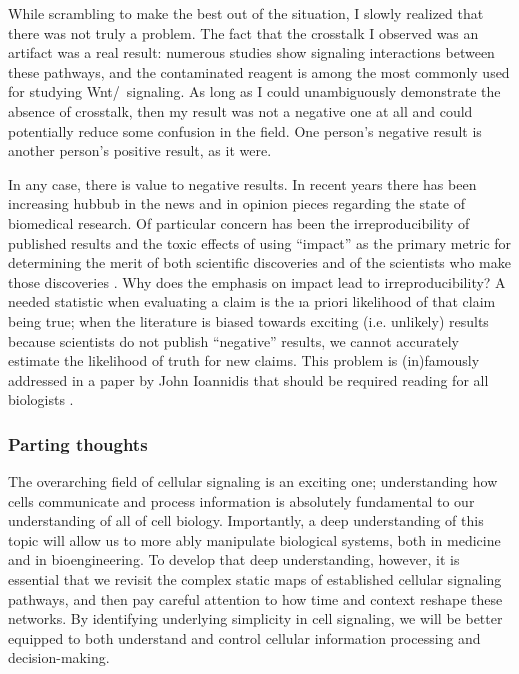 While scrambling to make the best out of the situation, I slowly
realized that there was not truly a problem. The fact that the crosstalk
I observed was an artifact was a real result: numerous studies
show signaling interactions between these pathways, and the contaminated
reagent is among the most commonly used for studying Wnt/\bcat\
signaling. As long as I
could unambiguously demonstrate the absence of crosstalk, then my result
was not a negative one at all and could potentially reduce some confusion
in the field. One person's negative result is another person's positive
result, as it were.


In any case, there is value to negative results. In recent years there
has been increasing hubbub in the news and in opinion pieces regarding
the state of biomedical research. Of particular concern has been the
irreproducibility of published results and the toxic effects of
using ``impact'' as the primary metric for determining the merit
of both scientific discoveries and of the scientists who make those discoveries
\cite{Schatz2014,Alberts2014}. Why does the emphasis on impact lead to
irreproducibility? 
A needed statistic when evaluating a claim
is the \i{a priori} likelihood of that claim being true;
when the literature is biased towards exciting (i.e. unlikely)
results because scientists do not publish ``negative'' results, 
we cannot accurately
estimate the likelihood of truth for new claims. This problem
is (in)famously addressed in a paper by John Ioannidis
that should be required reading for all biologists \cite{Ioannidis2005}.


\subsubsection{Parting thoughts}


The overarching field of cellular signaling is an exciting one;
understanding how cells communicate and process information
is absolutely fundamental to our understanding of all of
cell biology. Importantly, a deep understanding of this
topic will allow us to more ably manipulate biological systems,
both in medicine and in bioengineering.
To develop that deep understanding, however, it is essential
that we revisit the complex static maps of established cellular signaling
pathways, and then pay careful attention to how time and context
reshape these networks. By identifying underlying simplicity
in cell signaling, we will be better equipped to both understand
and control cellular information processing and decision-making.
